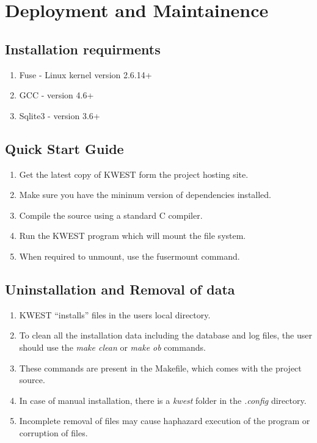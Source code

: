 \chapter{Deployment and Maintainence}

\section{Installation requirments}

\begin{enumerate}
\item Fuse - Linux kernel version 2.6.14+
\item GCC - version 4.6+
\item Sqlite3 - version 3.6+
\end{enumerate}

\section{Quick Start Guide}
\begin{enumerate}
\item Get the latest copy of KWEST form the project hosting site.
\item Make sure you have the mininum version of dependencies installed.
\item Compile the source using a standard C compiler.
\item Run the KWEST program which will mount the file system.
\item When required to unmount, use the fusermount command.
\end{enumerate}

\section{Uninstallation and Removal of data}
\begin{enumerate}
\item KWEST ``installs'' files in the users local directory.
\item To clean all the installation data including the database and log files, the user should use the \emph{make clean} or \emph{make ob} commands.
\item These commands are present in the Makefile, which comes with the project source.
\item In case of manual installation, there is a \emph{kwest} folder in the \emph{.config} directory.
\item Incomplete removal of files may cause haphazard execution of the program or corruption of files.
\end{enumerate}

